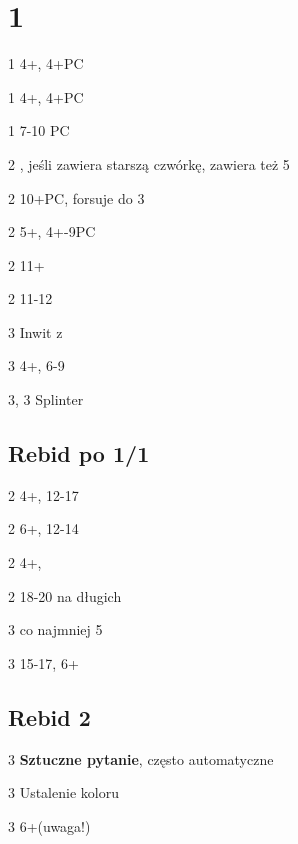 \documentclass[12pt, a4paper]{article}
\begin{document}
\pagebreak

\section*{1\diams}
\sequence{{1\diams}}
\begin{options}[2]
    \item[1\hearts] 4+\hearts, 4+PC
    \item[1\spades] 4+\spades, 4+PC
    \item[1\nt] 7-10 PC
    \item[2\clubs] \gf, jeśli zawiera starszą czwórkę, zawiera też 5\clubs
    \item[2\diams] 10+PC, forsuje do 3\diams
    \item[2\hearts] 5+\spades, 4+-9PC
    \item[2\spades] 11+ \bal 
    \item[2\nt] 11-12
    \item[3\clubs] Inwit z \clubs
    \item[3\diams] 4+\diams, 6-9
    \item[3\hearts, 3\spades] Splinter          
\end{options}


\subsection*{Rebid po 1/1}
\sequence{{1\diams}{1\hearts}}
\begin{options}[1]
    \item[2\clubs] 4+\clubs, 12-17
    \item[2\diams] 6+\diams, 12-14
    \item[2\spades] 4+\spades, \gf
    \item[2\nt] 18-20 \bal \orr \gf na długich \diams
    \item[3\clubs] co najmniej 5\clubs \gf
    \item[3\diams] 15-17, 6+\diams    
\end{options}

\subsection*{Rebid 2\nt}
\sequence{{1\diams}{1\hearts}{2\ntx}}
\begin{options}[2]
    \item[3\clubs] \textbf{Sztuczne pytanie}, często automatyczne \vimp
    \item[3\diams] Ustalenie koloru
    \item[3\hearts] 6+\hearts (uwaga!)
\end{options}
\end{document}
